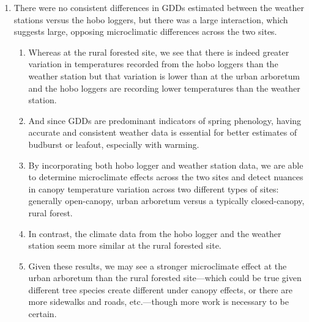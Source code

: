 \documentclass{article}\usepackage[]{graphicx}\usepackage[]{color}
\begin{document}
\begin{enumerate}
\item There were no consistent differences in GDDs estimated between the weather stations versus the hobo loggers, but there was a large interaction, which suggests large, opposing microclimatic differences across the two sites.
  \begin{enumerate}
  \item Whereas at the rural forested site, we see that there is indeed greater variation in temperatures recorded from the hobo loggers than the weather station but that variation is lower than at the urban arboretum and the hobo loggers are recording lower temperatures than the weather station.
  \item And since GDDs are predominant indicators of spring phenology, having accurate and consistent weather data is essential for better estimates of budburst or leafout, especially with warming.
  \item By incorporating both hobo logger and weather station data, we are able to determine microclimate effects across the two sites and detect nuances in canopy temperature variation across two different types of sites: generally open-canopy, urban arboretum versus a typically closed-canopy, rural forest.
  \item In contrast, the climate data from the hobo logger and the weather station seem more similar at the rural forested site.
  \item Given these results, we may see a stronger microclimate effect at the urban arboretum than the rural forested site---which could be true given different tree species create different under canopy effects, or there are more sidewalks and roads, etc.---though more work is necessary to be certain.
  \end{enumerate}
\end{enumerate}
\end{document}
